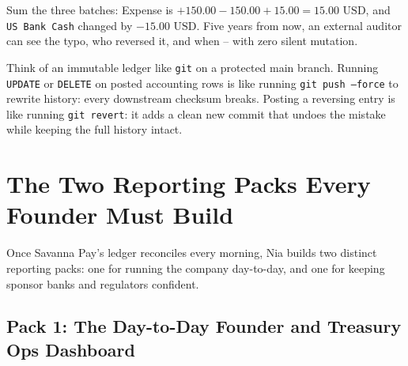Sum the three batches: Expense is $+150.00 - 150.00 + 15.00 = 15.00\text{ USD}$, and \texttt{US Bank Cash} changed by $-15.00\text{ USD}$. Five years from now, an external auditor can see the typo, who reversed it, and when -- with zero silent mutation.

\begin{happeningbox}
Think of an immutable ledger like \texttt{git} on a protected main branch. Running \texttt{UPDATE} or \texttt{DELETE} on posted accounting rows is like running \texttt{git push --force} to rewrite history: every downstream checksum breaks. Posting a reversing entry is like running \texttt{git revert}: it adds a clean new commit that undoes the mistake while keeping the full history intact.
\end{happeningbox}

\section{The Two Reporting Packs Every Founder Must Build}

Once Savanna Pay's ledger reconciles every morning, Nia builds two distinct reporting packs: one for running the company day-to-day, and one for keeping sponsor banks and regulators confident.

\subsection{Pack 1: The Day-to-Day Founder and Treasury Ops Dashboard}

